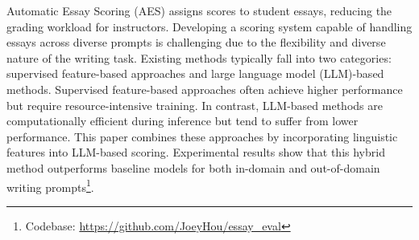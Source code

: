 
Automatic Essay Scoring (AES) assigns scores to student essays, reducing the grading workload for instructors. Developing a scoring system capable of handling essays across diverse prompts is challenging due to the flexibility and diverse nature of the writing task. Existing methods typically fall into two categories: supervised feature-based approaches and large language model (LLM)-based methods. Supervised feature-based approaches often achieve higher performance but require resource-intensive training. In contrast, LLM-based methods are computationally efficient during inference but tend to suffer from lower performance. This paper combines these approaches by incorporating linguistic features into LLM-based scoring. Experimental results show that this hybrid method outperforms baseline models for both in-domain and out-of-domain writing prompts\footnote{Codebase: \url{https://github.com/JoeyHou/essay_eval}}.

